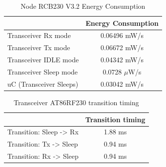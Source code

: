 \begin{table}[H]
 \begin{center}
  \begin{tabular}{|l|c|}
   \hline
   & \textbf{Energy Consumption} \\
   \hline
   Transceiver \ac{Rx} mode & 0.06496 mW/s \\
   \hline 
   Transceiver \ac{Tx} mode & 0.06672 mW/s \\
   \hline
   Transceiver IDLE mode & 0.04342 mW/s \\
   \hline
   Transceiver Sleep mode & 0.0728 $\mu$W/s \\
   \hline
   \ac{uC} (Transceiver Sleeps) & 0.03042 mW/s \\
   \hline
  \end{tabular}
  \caption{Node RCB230 V3.2 Energy Consumption \cite{LPLandOLP}}
  \label{tab:NodeEnergyConsumption}
 \end{center}
\end{table}
\begin{table}[H]
 \begin{center}
  \begin{tabular}{|l|c|}
   \hline
   & \textbf{Transition timing} \\
   \hline
   Transition: Sleep -> \ac{Rx} & 1.88 ms \\
   \hline 
   Transition: \ac{Tx} -> Sleep & 0.94 ms \\
   \hline
   Transition: \ac{Rx} -> Sleep & 0.94 ms \\
   \hline
  \end{tabular}
  \caption{Transceiver AT86RF230 transition timing \cite{LPLandOLP}}
  \label{tab:NodeTiming}
 \end{center}
\end{table}